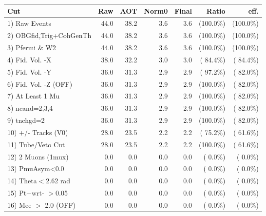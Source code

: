  \begin{table}[h!]\centering
 \begin{tabular}{||l||r|r|r|r|r|r||}
 \hline
 \hline
 Cut & Raw & AOT & Norm0 & Final & Ratio & eff.       \\
 \hline
  1) Raw Events           &         44.0 &         38.2 &          3.6 &          3.6 & (100.0\%) & (100.0\%) \\
  2) OBGfid,Trig+CohGenTh &         44.0 &         38.2 &          3.6 &          3.6 & (100.0\%) & (100.0\%) \\
  3) Pfermi \& W2         &         44.0 &         38.2 &          3.6 &          3.6 & (100.0\%) & (100.0\%) \\
  4) Fid. Vol. -X         &         38.0 &         32.2 &          3.0 &          3.0 & ( 84.4\%) & ( 84.4\%) \\
  5) Fid. Vol. -Y         &         36.0 &         31.3 &          2.9 &          2.9 & ( 97.2\%) & ( 82.0\%) \\
  6) Fid. Vol. -Z (OFF)   &         36.0 &         31.3 &          2.9 &          2.9 & (100.0\%) & ( 82.0\%) \\
  7) At Least 1 Mu        &         36.0 &         31.3 &          2.9 &          2.9 & (100.0\%) & ( 82.0\%) \\
  8) ncand=2,3,4          &         36.0 &         31.3 &          2.9 &          2.9 & (100.0\%) & ( 82.0\%) \\
  9) tnchgd=2             &         36.0 &         31.3 &          2.9 &          2.9 & (100.0\%) & ( 82.0\%) \\
 10) +/- Tracks (V0)      &         28.0 &         23.5 &          2.2 &          2.2 & ( 75.2\%) & ( 61.6\%) \\
 11) Tube/Veto Cut        &         28.0 &         23.5 &          2.2 &          2.2 & (100.0\%) & ( 61.6\%) \\
 12) 2 Muons (1mux)       &          0.0 &          0.0 &          0.0 &          0.0 & (  0.0\%) & (  0.0\%) \\
 13) PmuAsym<0.0          &          0.0 &          0.0 &          0.0 &          0.0 & (  0.0\%) & (  0.0\%) \\
 14) Theta$<$2.62 rad     &          0.0 &          0.0 &          0.0 &          0.0 & (  0.0\%) & (  0.0\%) \\
 15) Pt+wrt- $>$0.05      &          0.0 &          0.0 &          0.0 &          0.0 & (  0.0\%) & (  0.0\%) \\
 16) Mee $>$ 2.0  (OFF)   &          0.0 &          0.0 &          0.0 &          0.0 & (  0.0\%) & (  0.0\%) \\

\end{tabular}
\end{table}
